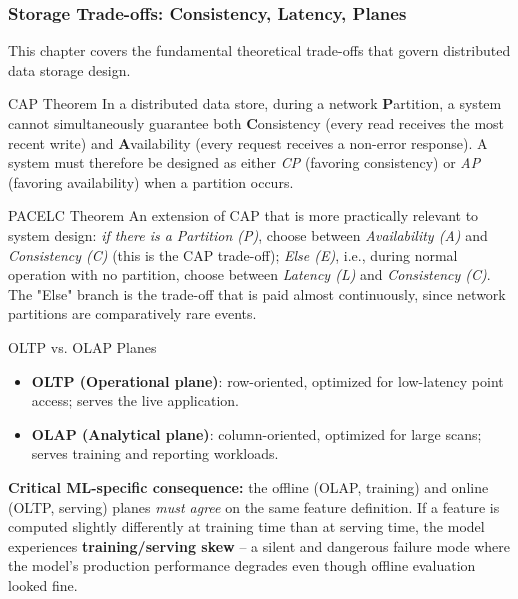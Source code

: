\subsubsection{Storage Trade-offs: Consistency, Latency, Planes}

This chapter covers the fundamental theoretical trade-offs that govern distributed data storage design.

\begin{defbox}{CAP Theorem}
In a distributed data store, during a network \textbf{P}artition, a system cannot simultaneously guarantee both \textbf{C}onsistency (every read receives the most recent write) and \textbf{A}vailability (every request receives a non-error response). A system must therefore be designed as either \emph{CP} (favoring consistency) or \emph{AP} (favoring availability) when a partition occurs.
\end{defbox}

\begin{defbox}{PACELC Theorem}
An extension of CAP that is more practically relevant to system design: \emph{if there is a Partition (P)}, choose between \emph{Availability (A)} and \emph{Consistency (C)} (this is the CAP trade-off); \emph{Else (E)}, i.e., during normal operation with no partition, choose between \emph{Latency (L)} and \emph{Consistency (C)}. The "Else" branch is the trade-off that is paid almost continuously, since network partitions are comparatively rare events.
\end{defbox}

\begin{defbox}{OLTP vs. OLAP Planes}
\begin{itemize}
    \item \textbf{OLTP (Operational plane)}: row-oriented, optimized for low-latency point access; serves the live application.
    \item \textbf{OLAP (Analytical plane)}: column-oriented, optimized for large scans; serves training and reporting workloads.
\end{itemize}
\end{defbox}

\textbf{Critical ML-specific consequence:} the offline (OLAP, training) and online (OLTP, serving) planes \emph{must agree} on the same feature definition. If a feature is computed slightly differently at training time than at serving time, the model experiences \textbf{training/serving skew} -- a silent and dangerous failure mode where the model's production performance degrades even though offline evaluation looked fine.

